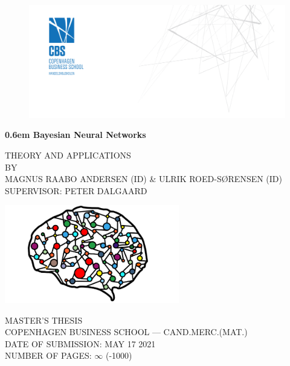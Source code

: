 \documentclass[a4paper]{book}
\numberwithin{mytheorem}{chapter}
\numberwithin{equation}{section}
\begin{document}
\begin{titlepage}
\clearpage
\newcommand\nbvspace[1][3]{\vspace*{\stretch{#1}}}
\newcommand\nbstretchyspace{\spaceskip0.5em plus 0.25em minus 0.25em}
\newcommand{\nbtitlestretch}{\spaceskip0.6em}
\thispagestyle{empty}
\begin{center}
\begin{figure}
\begin{center}
\includegraphics[scale=0.55]{pics/CBS.jpg}
\end{center} 
\end{figure}
	\bfseries
	\Huge
	{\nbtitlestretch\huge
	 Bayesian Neural Networks}
	 \nbvspace[1]
	\normalsize
	
	THEORY AND APPLICATIONS\\
	\footnotesize BY\\
	\footnotesize MAGNUS RAABO ANDERSEN (ID) \& ULRIK ROED-SØRENSEN (ID)\\[0.5em]
	\footnotesize SUPERVISOR: PETER DALGAARD
	
	\nbvspace[1]
	
	\includegraphics[width=3in]{pics/neural_network.png}
	\nbvspace[1]
	
	MASTER'S THESIS \\ 
	COPENHAGEN BUSINESS SCHOOL --- CAND.MERC.(MAT.)\\
    \nbvspace[1]
    DATE OF SUBMISSION: MAY 17 2021\\
    NUMBER OF PAGES: $\infty$ (-1000)
	
	\nbvspace[1]
\end{center}
\end{titlepage}
\end{document}
